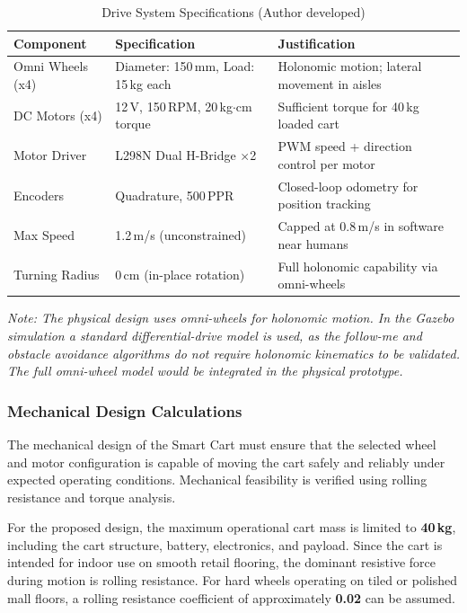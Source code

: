 \begin{table}[!ht]
\caption{Drive System Specifications (Author developed)}
\label{tab:drive}
\centering
\footnotesize
\begin{tabular}{p{2.0cm} p{2.5cm} p{2.5cm}}
\toprule
\textbf{Component} & \textbf{Specification} & \textbf{Justification} \\
\midrule
Omni Wheels (x4) & Diameter: 150\,mm, Load: 15\,kg each & Holonomic motion; lateral movement in aisles \\
DC Motors (x4) & 12\,V, 150\,RPM, 20\,kg$\cdot$cm torque & Sufficient torque for 40\,kg loaded cart \\
Motor Driver & L298N Dual H-Bridge $\times$2 & PWM speed + direction control per motor \\
Encoders & Quadrature, 500\,PPR & Closed-loop odometry for position tracking \\
Max Speed & 1.2\,m/s (unconstrained) & Capped at 0.8\,m/s in software near humans \\
Turning Radius & 0\,cm (in-place rotation) & Full holonomic capability via omni-wheels \\
\bottomrule
\end{tabular}
\end{table}

\textit{Note: The physical design uses omni-wheels for holonomic
motion. In the Gazebo simulation a standard differential-drive model
is used, as the follow-me and obstacle avoidance algorithms do not
require holonomic kinematics to be validated. The full omni-wheel
model would be integrated in the physical prototype.}

\subsubsection{Mechanical Design Calculations}

The mechanical design of the Smart Cart must ensure that the selected wheel and motor configuration is capable of moving the cart safely and reliably under expected operating conditions. 
Mechanical feasibility is verified using rolling resistance and torque analysis.

For the proposed design, the maximum operational cart mass is limited to \textbf{40\,kg}, including the cart structure, battery, electronics, and
payload. Since the cart is intended for indoor use on smooth retail flooring, the dominant resistive force during motion is rolling resistance. For hard wheels operating on tiled or polished mall floors,
a rolling resistance coefficient of approximately \textbf{0.02} can be assumed.

